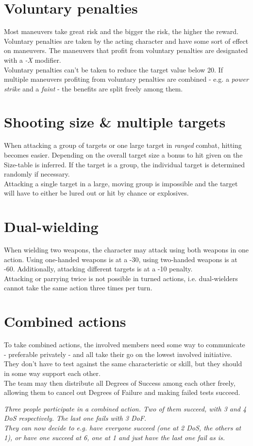 \section{Voluntary penalties}
Most maneuvers take great risk and the bigger the risk, the higher the reward. Voluntary penalties are taken by the acting character and have some sort of effect on maneuvers. The maneuvers that profit from voluntary penalties are designated with a \emph{-X} modifier.\\
Voluntary penalties can’t be taken to reduce the target value below 20. If multiple maneuvers profiting from voluntary penalties are combined - e.g. a \emph{power strike} and a \emph{faint} - the benefits are split freely among them.
\section{Shooting size \& multiple targets}
When attacking a group of targets or one large target in \emph{ranged} combat, hitting becomes easier. Depending on the overall target size a bonus to hit given on the Size-table is inferred. If the target is a group, the individual target is determined randomly if necessary.\\
Attacking a single target in a large, moving group is impossible and the target will have to either be lured out or hit by chance or explosives.
\section{Dual-wielding}
When wielding two weapons, the character may attack using both weapons in one action. Using one-handed weapons is at a -30, using two-handed weapons is at -60. Additionally, attacking different targets is at a -10 penalty.\\
Attacking or parrying twice is not possible in turned actions, i.e. dual-wielders cannot take the same action three times per turn.
\section{Combined actions}
\label{combinedaction}
To take combined actions, the involved members need some way to communicate - preferable privately - and all take their go on the lowest involved initiative. They don't have to test against the same characteristic or skill, but they should in some way support each other.\\
The team may then distribute all Degrees of Success among each other freely, allowing them to cancel out Degrees of Failure and making failed tests succeed.
\begin{exampleblock}
	\itshape
	Three people participate in a combined action. Two of them succeed, with 3 and 4 DoS respectively. The last one fails with 3 DoF.\\
	They can now decide to e.g. have everyone succeed (one at 2 DoS, the others at 1), or have one succeed at 6, one at 1 and just have the last one fail as is.
\end{exampleblock}
